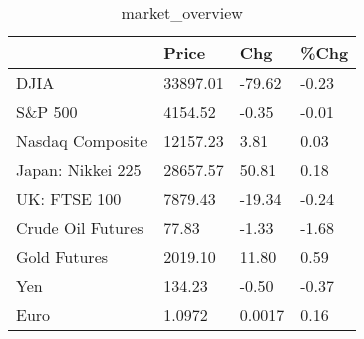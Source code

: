 \documentclass{article}%
\begin{document}
%


\begin{table}[htbp]%
\caption{market\_overview}%
\centering%
\begin{adjustbox}{width=1\textwidth}%
\begin{tabular}{llll}
\toprule
                  &    Price &    Chg &  \%Chg \\
\midrule
             DJIA & 33897.01 & -79.62 & -0.23 \\
          S\&P 500 &  4154.52 &  -0.35 & -0.01 \\
 Nasdaq Composite & 12157.23 &   3.81 &  0.03 \\
Japan: Nikkei 225 & 28657.57 &  50.81 &  0.18 \\
     UK: FTSE 100 &  7879.43 & -19.34 & -0.24 \\
Crude Oil Futures &    77.83 &  -1.33 & -1.68 \\
     Gold Futures &  2019.10 &  11.80 &  0.59 \\
              Yen &   134.23 &  -0.50 & -0.37 \\
             Euro &   1.0972 & 0.0017 &  0.16 \\
\bottomrule
\end{tabular}
%
\end{adjustbox}%
\end{table}

%
\end{document}
